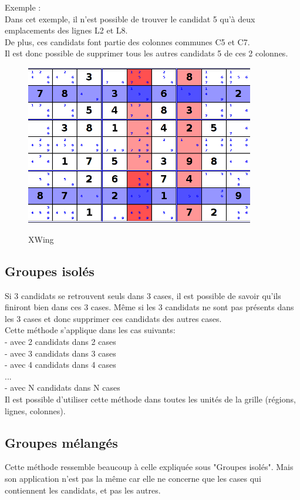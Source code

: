 Exemple :\\
Dans cet exemple, il n'est possible de trouver le candidat 5 
qu'à deux emplacements des lignes L2 et L8.\\ 
De plus, ces candidats font partie des colonnes communes C5 et C7.\\ 
Il est donc possible de supprimer tous les autres candidats 5 de ces 2 colonnes. 

\begin{figure}[ht]
  \caption{\label{annexe5} XWing}
  \includegraphics [width=100mm]{images/XWing.png} \\[0.5cm]
\end{figure}

\newpage

\subsection{Groupes isolés}
Si 3 candidats se retrouvent seuls dans 3 cases, il est possible de savoir qu'ils finiront bien dans ces 3 cases. 
Même si les 3 candidats ne sont pas présents dans les 3 cases et donc supprimer ces candidats des autres cases.
\\
Cette méthode s'applique dans les cas suivants:\\
- avec 2 candidats dans 2 cases\\
- avec 3 candidats dans 3 cases\\
- avec 4 candidats dans 4 cases\\
...\\
- avec N candidats dans N cases\\

Il est possible d'utiliser cette méthode dans toutes les unités de la grille (régions, lignes, colonnes).

\subsection{Groupes mélangés}
Cette méthode ressemble beaucoup à celle expliquée sous "Groupes isolés". 
Mais son application n'est pas la même car elle ne concerne que les cases qui contiennent les candidats, 
et pas les autres.\\
\\

